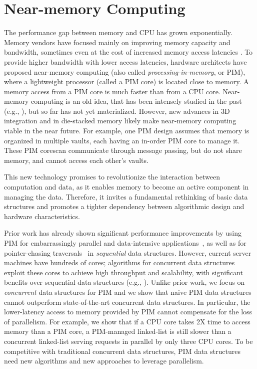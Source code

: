 \section{Near-memory Computing}

The performance gap between memory and CPU has grown exponentially. 
Memory vendors have focused mainly on improving memory capacity and bandwidth, 
sometimes even at the cost of increased memory access latencies \cite{Chang:2016}. 
To provide higher bandwidth with lower access latencies, hardware architects have proposed near-memory computing (also called \textit{processing-in-memory}, or PIM), where a lightweight processor (called a PIM core) is located close to memory. A memory access from a PIM core is much faster than from a CPU core. 
Near-memory computing is an old idea, that has been intensely studied in the past (e.g., 
\cite{Stone1970, Kogge1994, Gokhale1995, Patterson1997, Oskin1998, KangHYKGLTP99, Hall1999, Elliott:1992}), 
but so far has not yet materialized. However, new advances in 3D integration and in die-stacked memory 
likely make near-memory computing viable in the near future. 
For example, one PIM design \cite{Ahn2015:2, Zhang2014:TTP, Ahn2015:1} assumes that 
memory is organized in multiple vaults, each having an in-order PIM core to manage it. 
These PIM corescan communicate through message passing, but do not share memory, and cannot access each other's vaults. 

This new technology promises to revolutionize the interaction between computation and data, 
as it enables memory to become an active component in managing the data. 
Therefore, it invites a fundamental rethinking of basic data structures and promotes a tighter dependency between algorithmic design and hardware characteristics. 

Prior work has already shown significant performance improvements by using PIM for embarrassingly parallel 
and data-intensive applications~\cite{Zhang2014:TTP, Ahn2015:2, ZhuASSHPF13, Akin2015:DRM, Hsieh:2016:TOM}, 
as well as for pointer-chasing traversals~\cite{hsieh2016accelerating} in \emph{sequential} data structures. 
However, current server machines have hundreds of cores; 
algorithms for concurrent data structures exploit these cores to achieve high throughput and scalability, 
with significant benefits over sequential data structures 
(e.g., \cite{practicallf, skiplists-concpugh, valois, Herlihy08}).
Unlike prior work, we focus on \emph{concurrent} data structures for PIM 
and we show that naive PIM data structures cannot outperform 
state-of-the-art concurrent data structures. 
In particular, the lower-latency access to memory provided by PIM cannot compensate 
for the loss of parallelism. 
For example, we show that if a CPU core takes 2X time to access memory than a PIM core, 
a PIM-managed linked-list is still slower than a concurrent linked-list serving requests in parallel 
by only three CPU cores. 
To be competitive with traditional concurrent data structures, 
PIM data structures need new algorithms and new approaches to leverage parallelism.  

